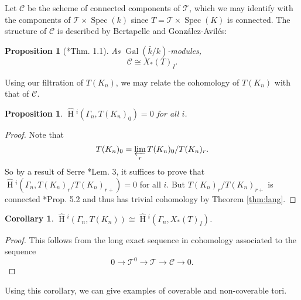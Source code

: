 \documentclass{compositio}
\theoremstyle{plain}
\newtheorem{proposition}[theorem]{Proposition}
\newtheorem{corollary}[theorem]{Corollary}
\newcommand{\HT}[1]{\hat{\HH}{}^{#1}}
\theoremstyle{definition}
\numberwithin{equation}{section}
\DeclareMathOperator{\Gal}{Gal}
\DeclareMathOperator{\HH}{H}
\DeclareMathOperator{\Spec}{Spec}
\newcommand{\TT}{\mathcal{T}}
\newcommand{\C}{\mathcal{C}}
\newcommand{\invlim}[1]{\varprojlim_{#1}}
\begin{document}
Let $\C$ be the scheme of
connected components of $\TT$,
which we may identify with the
components of $\TT \times \Spec(k)$ since $T = \TT \times \Spec(K)$
is connected.  The structure of $\C$ is described by Bertapelle and Gonz\'alez-Avil\'es:

\begin{proposition}[{\cite{bertapelle-gonzalez:13b}*{Thm. 1.1}}]
As $\Gal(\bar{k}/k)$-modules,
\[
\C \cong X_*(T)_I.
\]
\end{proposition}

Using our filtration of $T(K_n)$, we may relate the cohomology of $T(K_n)$
with that of $\C$.

\begin{proposition}\label{prop:T0_cohom_triv}
$\HT{i}(\Gamma_n, T(K_n)_0) = 0$ for all $i$.
\end{proposition}
\begin{proof}
Note that
$$T(K_n)_0 = \invlim{r} T(K_n)_0 / T(K_n)_r.$$
So by a result of Serre \cite{serre:LocalClassFieldThy}*{Lem. 3}, it suffices to prove that
\\ $\HT{i}(\Gamma_n, T(K_n)_r / T(K_n)_{r+}) = 0$ for all $i$.  But $T(K_n)_r / T(K_n)_{r+}$
is connected \cite{yu:03a}*{Prop. 5.2} and thus has trivial cohomology by
Theorem \ref{thm:lang}.
\end{proof}

\begin{corollary} \label{cor:cohom_tori}
$\HT{i}(\Gamma_n, T(K_n)) \cong \HT{i}(\Gamma_n, X_*(T)_I)$.
\end{corollary}

\begin{proof}
This follows from the long exact sequence in cohomology associated to the sequence
$$0 \rightarrow \TT^0 \rightarrow \TT \rightarrow \C \rightarrow 0.$$
\end{proof}

Using this corollary, we can give examples of coverable and non-coverable tori.
\end{document}
